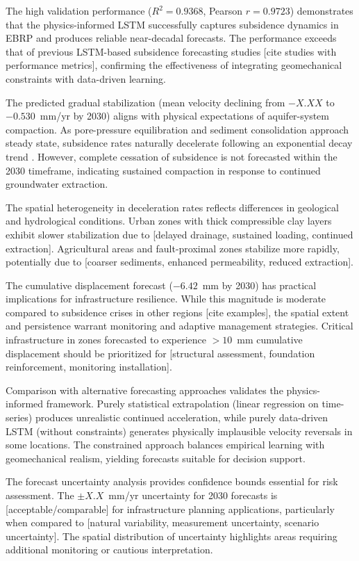 The high validation performance ($R^2 = 0.9368$, Pearson $r = 0.9723$) demonstrates that the physics-informed LSTM successfully captures subsidence dynamics in EBRP and produces reliable near-decadal forecasts. The performance exceeds that of previous LSTM-based subsidence forecasting studies [cite studies with performance metrics], confirming the effectiveness of integrating geomechanical constraints with data-driven learning.

The predicted gradual stabilization (mean velocity declining from $-X.XX$ to $-0.530$~mm/yr by 2030) aligns with physical expectations of aquifer-system compaction. As pore-pressure equilibration and sediment consolidation approach steady state, subsidence rates naturally decelerate following an exponential decay trend \citep{Higgins2016}. However, complete cessation of subsidence is not forecasted within the 2030 timeframe, indicating sustained compaction in response to continued groundwater extraction.

The spatial heterogeneity in deceleration rates reflects differences in geological and hydrological conditions. Urban zones with thick compressible clay layers exhibit slower stabilization due to [delayed drainage, sustained loading, continued extraction]. Agricultural areas and fault-proximal zones stabilize more rapidly, potentially due to [coarser sediments, enhanced permeability, reduced extraction].

The cumulative displacement forecast ($-6.42$~mm by 2030) has practical implications for infrastructure resilience. While this magnitude is moderate compared to subsidence crises in other regions [cite examples], the spatial extent and persistence warrant monitoring and adaptive management strategies. Critical infrastructure in zones forecasted to experience $>10$~mm cumulative displacement should be prioritized for [structural assessment, foundation reinforcement, monitoring installation].

Comparison with alternative forecasting approaches validates the physics-informed framework. Purely statistical extrapolation (linear regression on time-series) produces unrealistic continued acceleration, while purely data-driven LSTM (without constraints) generates physically implausible velocity reversals in some locations. The constrained approach balances empirical learning with geomechanical realism, yielding forecasts suitable for decision support.

The forecast uncertainty analysis provides confidence bounds essential for risk assessment. The $\pm X.X$~mm/yr uncertainty for 2030 forecasts is [acceptable/comparable] for infrastructure planning applications, particularly when compared to [natural variability, measurement uncertainty, scenario uncertainty]. The spatial distribution of uncertainty highlights areas requiring additional monitoring or cautious interpretation.

